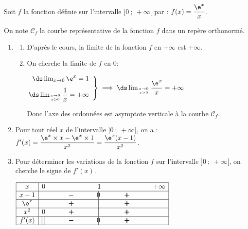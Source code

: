\medskip

Soit $f$ la fonction définie sur l'intervalle $]0~;~ +\infty[$ par :
$f(x) = \dfrac{\e^x}{x}$.

On note $\mathcal{C}_f$ la courbe représentative de la fonction $f$ dans un repère orthonormé. 



\begin{enumerate}
\item 
	\begin{enumerate}
		\item D'après le cours, la limite de la fonction $f$ en $+ \infty$ est $+\infty$.
		
		\item On cherche la limite de $f$ en 0:
		
$\left.
\begin{array}{@{} r}
\ds\lim_{x\to 0} \e^{x} = 1\\[7pt]
\ds\lim_{x\to 0\atop x>0} \dfrac{1}{x}= +\infty
\end{array}
\right \rbrace
\implies
\ds\lim_{x\to 0 \atop x>0} \dfrac{\e^{x}}{x}  = +\infty$		
		
Donc l'axe des ordonnées est asymptote verticale à la courbe $\mathcal{C}_f$.
	\end{enumerate}
\item Pour tout réel $x$ de l'intervalle $]0~;~ +\infty[$, on a :
$f'(x)=\dfrac{\e^{x}\times x - \e^{x}\times 1}{x^2} = \dfrac{\e^{x} (x-1)}{x^2}$.

\item Pour déterminer les variations de la fonction $f$ sur l'intervalle $]0~;~ +\infty[$, on cherche le signe de $f'(x)$.

\begin{center}
{\renewcommand{\arraystretch}{1.5}
\def\esp{\hspace*{2cm}}
$\begin{array}{|c | *{5}{c} |} 
\hline
x  & 0 & \esp & 1 & \esp  & +\infty \\
\hline
x-1 &  & \pmb{-} &  \vline\hspace{-2.7pt}{0} & \pmb{+} &   \\
\hline
\e^{x} &  & \pmb{+} &  \vline\hspace{-2.7pt}{\phantom 0} & \pmb{+} &   \\
\hline
x^2 & 0 \hfill{} & \pmb{+} &  \vline\hspace{-2.7pt}{\phantom 0} & \pmb{+} &   \\
\hline
f'(x) &  \vline\;\vline\hfill{} & \pmb{-} &  \vline\hspace{-2.7pt}{0} & \pmb{+} &   \\
\hline
\end{array}$
}
\end{center}


\end{enumerate}
